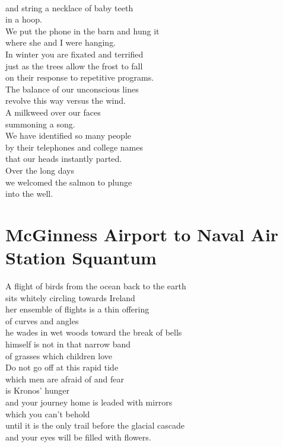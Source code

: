 \documentclass[smalldemyvopaper,11pt,twoside,onecolumn,openright,extrafontsizes]{memoir}
\begin{document}
\\and string a necklace of baby teeth
\\in a hoop.
\\We put the phone in the barn and hung it
\\where she and I were hanging.
\\In winter you are fixated and terrified
\\just as the trees allow the frost to fall
\\on their response to repetitive programs.
\\The balance of our unconscious lines
\\revolve this way versus the wind.
\\A milkweed over our faces
\\summoning a song.
\\We have identified so many people
\\by their telephones and college names
\\that our heads instantly parted.
\\Over the long days
\\we welcomed the salmon to plunge
\\into the well.



\chapter{McGinness Airport to Naval Air Station Squantum}
A flight of birds from the ocean back to the earth
\\sits whitely circling towards Ireland
\\her ensemble of flights is a thin offering
\\of curves and angles
\\he wades in wet woods toward the break of bells
\\himself is not in that narrow band
\\of grasses which children love
\\Do not go off at this rapid tide
\\which men are afraid of and fear
\\is Kronos' hunger
\\and your journey home is leaded with mirrors
\\which you can't behold
\\until it is the only trail before the glacial cascade
\\and your eyes will be filled with flowers.
\end{document}
